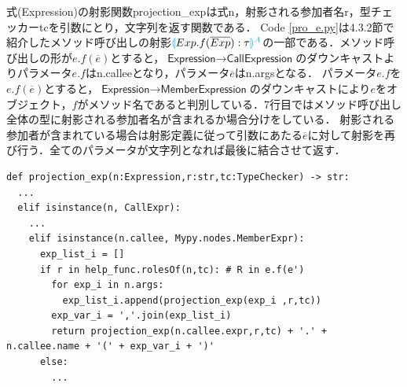 \documentclass{thesis}
\newcommand{\projection}[2]{{\color{cyan}\llparenthesis}#1{\color{cyan}\rrparenthesis^#2}}
\begin{document}
式(Expression)の射影関数projection\_expは式\textsf{n}，射影される参加者名\textsf{r}，型チェッカー\textsf{tc}を引数にとり，文字列を返す関数である．
Code \ref{pro_e.py}は4.3.2節で紹介したメソッド呼び出しの射影$\projection{Exp.f(\overline{Exp}):\tau}{A}$の一部である．メソッド呼び出しの形が$e.f(\overline{e})$とすると，$\textsf{Expression} \rightarrow \textsf{CallExpression}$のダウンキャストよりパラメータ$e.f$はn.calleeとなり，パラメータ$\overline{e}$はn.argsとなる．
パラメータ$e.f$を$e.f(\overline{e})$とすると，$\textsf{Expression} \rightarrow \textsf{MemberExpression}$のダウンキャストにより$e$をオブジェクト，$f$がメソッド名であると判別している．7行目ではメソッド呼び出し全体の型に射影される参加者名が含まれるか場合分けをしている．
射影される参加者が含まれている場合は射影定義に従って引数にあたる$\overline{e}$に対して射影を再び行う．全てのパラメータが文字列となれば最後に結合させて返す．

\begin{lstlisting}[caption=pro\_e.py,label=pro_e.py]
def projection_exp(n:Expression,r:str,tc:TypeChecker) -> str:
  ... 
  elif isinstance(n, CallExpr):
    ... 
    elif isinstance(n.callee, Mypy.nodes.MemberExpr):
      exp_list_i = []
      if r in help_func.rolesOf(n,tc): # R in e.f(e')
        for exp_i in n.args:
          exp_list_i.append(projection_exp(exp_i ,r,tc))
        exp_var_i = ','.join(exp_list_i)
        return projection_exp(n.callee.expr,r,tc) + '.' + n.callee.name + '(' + exp_var_i + ')'
      else:
        ... 
\end{lstlisting}
\end{document}

